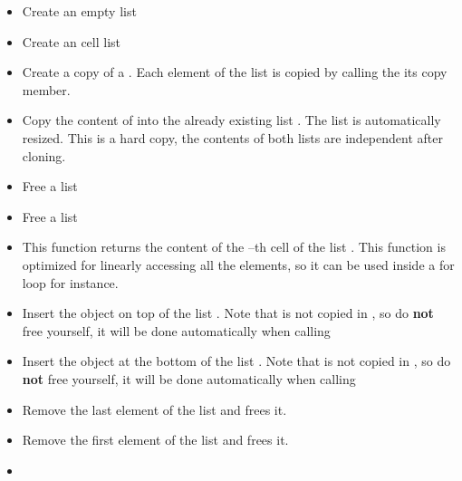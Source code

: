 \begin{itemize}
\item {}
  \sshortdescribe Create an empty list
\item {}
  \sshortdescribe Create an cell list
\item {}
  \sshortdescribe Create a copy of a \PnlList. Each element of the
  list  is copied by calling the its copy member.
\item {}
  \sshortdescribe Copy the content of  into the already existing
  list . The list  is automatically resized. This is a
  hard copy, the contents of both lists are independent after cloning.
\item {}
  \sshortdescribe Free a list
\item {}
  \sshortdescribe Free a list
\item {}
  \sshortdescribe This function returns the content of the --th cell of
  the list . This function is optimized for linearly accessing all the
  elements, so it can be used inside a for loop for instance.
\item {}
  \sshortdescribe Insert the object  on top of the list . Note that
   is not copied in , so do  {\bf not} free  yourself, it
  will be done automatically when calling 
\item {}
  \sshortdescribe Insert the object  at the bottom of the list . Note that
   is not copied in , so do  {\bf not} free  yourself, it
  will be done automatically when calling 
\item {}
  \sshortdescribe Remove the last element of the list  and frees it.
\item {}
  \sshortdescribe Remove the first element of the list  and frees it.
\item {}

\end{itemize}
